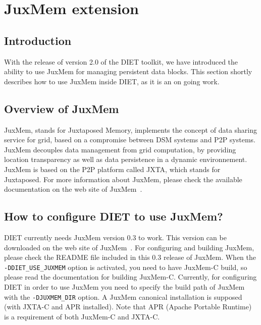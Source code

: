 
\chapter{JuxMem extension}
\label{ch:juxmem}

\section{Introduction}

With the release of version 2.0 of the DIET toolkit, we have introduced the
ability to use JuxMem for managing persistent data blocks. This
section shortly describes how to use JuxMem inside DIET, as it is an
on going work.

\section{Overview of JuxMem}

JuxMem, stands for Juxtaposed Memory, implements the concept of data
sharing service for grid, based on a compromise between DSM systems
and P2P systems. JuxMem decouples data management from grid
computation, by providing location transparency as well as data
persistence in a dynamic environnement. JuxMem is based on the P2P
platform called JXTA, which stands for Juxtaposed. For more
information about JuxMem, please check the available documentation on
the web site of JuxMem~\cite{JuxMem}.

\section{How to configure DIET to use JuxMem?}

DIET currently needs JuxMem version 0.3 to work. This version can be
downloaded on the web site of JuxMem~\cite{JuxMem}. For configuring
and building JuxMem, please check the README file included in this
0.3 release of JuxMem. When the \texttt{-DDIET\_USE\_JUXMEM} option is
activated, you need to have JuxMem-C build, so please read the
documentation for building JuxMem-C. Currently, for configuring DIET
in order to use JuxMem you need to specify the build path of JuxMem with
the \texttt{-DJUXMEM\_DIR} option. A JuxMem canonical installation is
 supposed (with JXTA-C and APR installed).
Note that APR (Apache Portable Runtime) is a requirement of both
JuxMem-C and JXTA-C.

